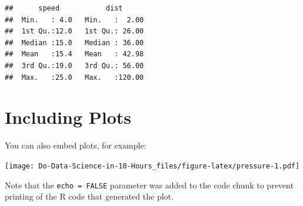 \documentclass[
]{book}
\begin{document}
\begin{verbatim}
##      speed           dist       
##  Min.   : 4.0   Min.   :  2.00  
##  1st Qu.:12.0   1st Qu.: 26.00  
##  Median :15.0   Median : 36.00  
##  Mean   :15.4   Mean   : 42.98  
##  3rd Qu.:19.0   3rd Qu.: 56.00  
##  Max.   :25.0   Max.   :120.00
\end{verbatim}

\hypertarget{including-plots}{%
\section{Including Plots}\label{including-plots}}

You can also embed plots, for example:

\texttt{[image: Do-Data-Science-in-10-Hours\_files/figure-latex/pressure-1.pdf]}

Note that the \texttt{echo\ =\ FALSE} parameter was added to the code chunk to prevent printing of the R code that generated the plot.

  

\printindex
\end{document}
